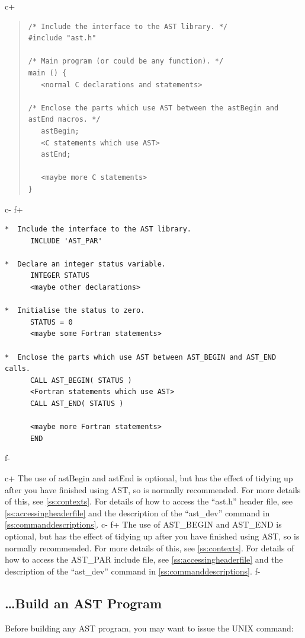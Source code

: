 \documentclass[twoside,11pt]{article}
\newcommand{\appref}[1]{Appendix~\ref{#1}}
\newcommand{\secref}[1]{\S\ref{#1}}
\renewcommand{\appref}[1]{\ref{#1}}
\renewcommand{\secref}[1]{\ref{#1}}
\begin{document}
c+
\begin{quote}
\small
\begin{verbatim}
/* Include the interface to the AST library. */
#include "ast.h"

/* Main program (or could be any function). */
main () {
   <normal C declarations and statements>

/* Enclose the parts which use AST between the astBegin and astEnd macros. */
   astBegin;
   <C statements which use AST>
   astEnd;

   <maybe more C statements>
}
\end{verbatim}
\normalsize
\end{quote}
c-
f+
\small
\begin{verbatim}
*  Include the interface to the AST library.
      INCLUDE 'AST_PAR'

*  Declare an integer status variable.
      INTEGER STATUS
      <maybe other declarations>

*  Initialise the status to zero.
      STATUS = 0
      <maybe some Fortran statements>

*  Enclose the parts which use AST between AST_BEGIN and AST_END calls.
      CALL AST_BEGIN( STATUS )
      <Fortran statements which use AST>
      CALL AST_END( STATUS )

      <maybe more Fortran statements>
      END
\end{verbatim}
\normalsize
f-

c+
The use of astBegin and astEnd is optional, but has the effect of
tidying up after you have finished using AST, so is normally
recommended. For more details of this, see \secref{ss:contexts}. For
details of how to access the ``ast.h'' header file, see
\secref{ss:accessingheaderfile} and the description of the
``ast\_dev'' command in \appref{ss:commanddescriptions}.
c-
f+
The use of AST\_BEGIN and AST\_END is optional, but has the effect of
tidying up after you have finished using AST, so is normally
recommended. For more details of this, see \secref{ss:contexts}. For
details of how to access the AST\_PAR include file, see
\secref{ss:accessingheaderfile} and the description of the
``ast\_dev'' command in \appref{ss:commanddescriptions}.
f-

\subsection{\label{ss:howtobuild}\ldots Build an AST Program}

Before building any AST program, you may want to issue the UNIX command:
\end{document}
